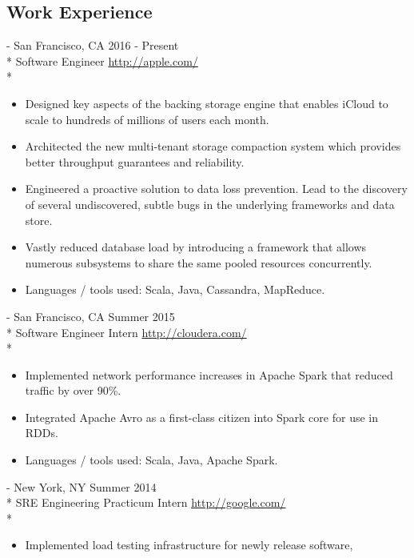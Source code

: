 \documentclass[a4paper,margin,line]{resume}
\newcommand{\rurl}[1]{\hfill {\footnotesize \url{#1}}}
\newcommand{\rdate}[1]{\hfill {\small #1}}
\renewcommand{\employer}[5]{ \item[#1] - #2 \rdate{#3} \\* #4 \rurl{#5} \\*}
\begin{document}
\begin{resume}
  \section{\mysidestyle Work Experience}
  \begin{asparadesc}
    \small \employer{Apple Inc. (iCloud)}{San Francisco, CA}{2016 - Present}{Software
      Engineer}{http://apple.com/}
    \vspace{-5mm}
    \begin{itemize}
      \item Designed key aspects of the backing storage engine that enables iCloud to scale to
        hundreds of millions of users each month.
      \item Architected the new multi-tenant storage compaction system which provides better
        throughput guarantees and reliability.
      \item Engineered a proactive solution to data loss prevention. Lead to the discovery of
        several undiscovered, subtle bugs in the underlying frameworks and data store.
      \item Vastly reduced database load by introducing a framework that allows numerous subsystems
        to share the same pooled resources concurrently.
      \item Languages / tools used: Scala, Java, Cassandra, MapReduce.
    \end{itemize}
    \employer{Cloudera}{San Francisco, CA}{Summer 2015}{Software Engineer
      Intern}{http://cloudera.com/}
    \vspace{-5mm}
    \begin{itemize}
    \item Implemented network performance increases in Apache Spark
      that reduced traffic by over 90\%.
    \item Integrated Apache Avro as a first-class citizen into Spark core for
      use in RDDs.
    \item Languages / tools used: Scala, Java, Apache Spark.
    \end{itemize}
    \employer{Google}{New York, NY}{Summer 2014}{SRE Engineering Practicum
      Intern}{http://google.com/}
    \vspace{-5mm}
    \begin{itemize}
    \item Implemented load testing infrastructure for newly release software,

\end{itemize}
\end{asparadesc}
\end{resume}
\end{document}
